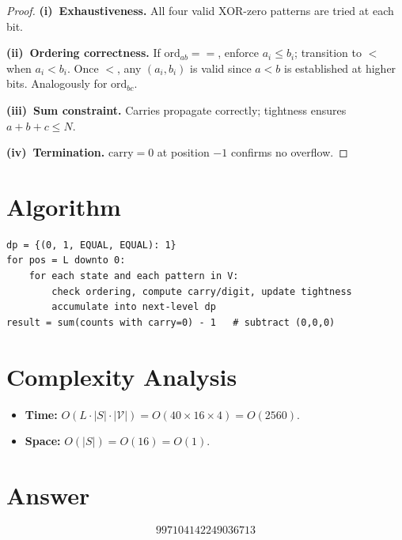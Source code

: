 \documentclass[12pt]{article}
\begin{document}
\begin{proof}
\textbf{(i)~Exhaustiveness.} All four valid XOR-zero patterns are tried at each bit.

\textbf{(ii)~Ordering correctness.} If $\mathrm{ord}_{ab}={=}$, enforce $a_i\le b_i$; transition to ${<}$ when $a_i<b_i$. Once ${<}$, any $(a_i,b_i)$ is valid since $a<b$ is established at higher bits. Analogously for $\mathrm{ord}_{bc}$.

\textbf{(iii)~Sum constraint.} Carries propagate correctly; tightness ensures $a+b+c\le N$.

\textbf{(iv)~Termination.} $\mathrm{carry}=0$ at position $-1$ confirms no overflow.
\end{proof}

\section{Algorithm}

\begin{verbatim}
dp = {(0, 1, EQUAL, EQUAL): 1}
for pos = L downto 0:
    for each state and each pattern in V:
        check ordering, compute carry/digit, update tightness
        accumulate into next-level dp
result = sum(counts with carry=0) - 1   # subtract (0,0,0)
\end{verbatim}

\section{Complexity Analysis}

\begin{itemize}
\item \textbf{Time:} $O(L\cdot|S|\cdot|\mathcal{V}|)=O(40\times 16\times 4)=O(2560)$.
\item \textbf{Space:} $O(|S|)=O(16)=O(1)$.
\end{itemize}

\section{Answer}

\[
\boxed{997104142249036713}
\]
\end{document}
